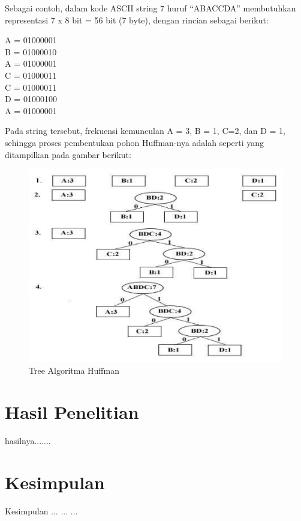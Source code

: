 \documentclass[journal]{IEEEtran}
\begin{document}
Sebagai contoh, dalam kode ASCII string 7 huruf “ABACCDA” membutuhkan representasi 7 x 8 bit = 56 bit (7 byte), dengan rincian sebagai berikut:
\begin{center}
	A = 01000001\\
	B = 01000010\\
	A = 01000001\\
	C = 01000011\\
	C = 01000011\\
	D = 01000100\\
	A = 01000001\\
\end{center}
Pada string tersebut, frekuensi kemunculan A = 3, B = 1, C=2, dan D = 1, sehingga proses pembentukan pohon Huffman-nya adalah seperti yang ditampilkan pada gambar berikut:
\begin{figure}
	\centering
	\includegraphics[width=\linewidth]{Capture.png}
	\caption{Tree Algoritma Huffman}
	\label{fig:tree}
\end{figure}
\section{Hasil Penelitian}
hasilnya.......


\section{Kesimpulan}
Kesimpulan ... ... ...
\end{document}
